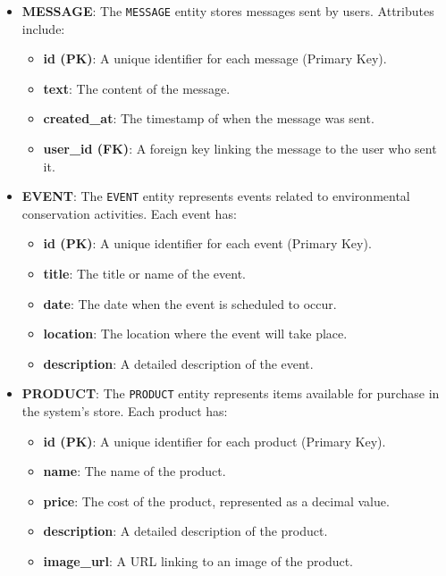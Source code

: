 \begin{itemize}
    \item \textbf{MESSAGE}: The \texttt{MESSAGE} entity stores messages sent by users. Attributes include:
    \begin{itemize}
        \item \textbf{id (PK)}: A unique identifier for each message (Primary Key).
        \item \textbf{text}: The content of the message.
        \item \textbf{created\_at}: The timestamp of when the message was sent.
        \item \textbf{user\_id (FK)}: A foreign key linking the message to the user who sent it.
    \end{itemize}

    \item \textbf{EVENT}: The \texttt{EVENT} entity represents events related to environmental conservation activities. Each event has:
    \begin{itemize}
        \item \textbf{id (PK)}: A unique identifier for each event (Primary Key).
        \item \textbf{title}: The title or name of the event.
        \item \textbf{date}: The date when the event is scheduled to occur.
        \item \textbf{location}: The location where the event will take place.
        \item \textbf{description}: A detailed description of the event.
    \end{itemize}

    \item \textbf{PRODUCT}: The \texttt{PRODUCT} entity represents items available for purchase in the system’s store. Each product has:
    \begin{itemize}
        \item \textbf{id (PK)}: A unique identifier for each product (Primary Key).
        \item \textbf{name}: The name of the product.
        \item \textbf{price}: The cost of the product, represented as a decimal value.
        \item \textbf{description}: A detailed description of the product.
        \item \textbf{image\_url}: A URL linking to an image of the product.
    \end{itemize}
\end{itemize}


